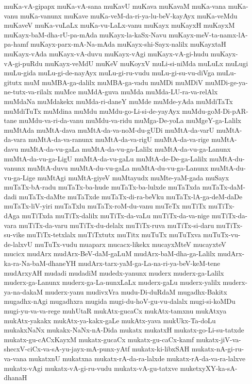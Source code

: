 {muKa-vA-gipapx
muKa-vA-sana
muKavU
muKava
muKavaM
muKa-vana
muKa-vanu
muKa-vanunx
muKave
muKa-veM-da-ri-ya-lu-beV-kayAyx
muKa-veMdu
muKaveV
muKa-vuLaLx
muKa-vu-LaLx-vanu
muKayx
muKayxH
muKayxM
muKayx-baM-dha-rU-pa-mAda
muKayx-la-kaSx-Navu
muKayx-meV-ta-namx-lA-pa-hamf
muKayx-parx-mA-Na-mAda
muKayx-shi-Sayx-nalilx
muKayxtaH
muKayx-vAda
muKayx-vA-duvu
muKayx-vAgi
muKayx-vA-gi-hudu
muKayx-vA-gi-puRdu
muKayx-veMdU
muKeV
muKoyxV
muLi-si-niMda
muLuLx
muLugi
muLu-gida
muLu-gi-de-nayAyx
muLu-gi-ru-vudu
muLu-gi-su-vu-diVga
muLu-gitutx
muM
muMBA-ga-dalilx
muMBA-ga-vadu
muMDi
muMDiV
muMDi-ge-ya-ne-tutx-va-rilalx
muMce
muMdA-guva
muMda
muMda-LU-ra-va-relAlx
muMdaNa
muMdakekx
muMda-ri-daneY
muMde
muMde-yAda
muMdiTaTx
muMdiTuTx
muMdina
muMdu
muMdu-go-Li-si-de-yayAyx
muMdu-goM-Di-pAR-tane
muMdu-va-ri-da-vanu
muMdu-va-ridu
muMga-De-yoLa
muMgeY-ga-Lalilx
muMtAda
muMtA-dava
muMtA-da-va-noM-du-gUDi
muMtA-da-varU
muMtA-da-vara
muMtA-da-va-ranunx
muMtA-da-va-rigU
muMtA-da-va-rige
muMtA-davu
muMtA-da-vu-gaLa
muMtA-da-vu-ga-Lalilx
muMtA-da-vu-ga-Lanunx
muMtA-da-vu-ga-LigU
muMtA-da-vu-gaLu
muMtA-de-De-ga-Lalilx
muMtA-du-vanunx
muMtA-duvu
muMtA-du-vu-gaLa
muMtA-du-vu-ga-Lanunx
muMtA-du-vu-ga-Lige
muMtAgi
muMtA-giyeV
muMtayudx
muMte-yaM-gada
muSayx
muTaTx-bA-radu
muTaTx-ba-hude
muTaTx-ba-lulxde
muTaTxda
muTaTx-daM-dadi
muTaTx-daMte
muTaTxde
muTaTx-di-ra-beVku
muTaTx-lA-ga-deM-daDe
muTaTx-liV-yiri
muTaTxlu
muTaTx-roM-du-vanu
muTeTx
muTiTx
muTiTx-dAga
muTiTxda
muTiTx-dalilx
muTiTx-da-vaLu
muTiTx-da-va-nige
muTiTx-da-vara
muTiTx-da-varu
muTiTx-du-delalx
muTiTx-ruva
muTiTx-si-daru
muTiTx-su-vike
muTiTx-tetxlalx
muTiTxtutx
muTitx
muTuTx
muTuTxva
muTuTx-vu-de-lalxvU
muTuTx-vudu
muaparx
mucacx-likekx
mucayxMteV
mucayxteV
mucicx
mudArx
mudArx-BeV-daM-gaLuM
mudArx-baM-dha-ga-Lalilx
mudArx-ka-ra-Na-baM-dhaneYH
mudArx-tarx-yaM-ga-La-na-ri-ya-beV-keM-tene
mudArxyAH
mudadi
mudadiM
mudedx-yanunx
muderx
muderx-ga-Lalilx
muderx-ga-Lanunx
muderx-ga-La-nunxLaLx
muderx-gaLu
muderx-yalilx
muderx-ya-na-dakaM
muderx-yanu
mudivxVra
mudu-Di-duRdaM
mugadhx-Bakitx
mugadhx-nAgi
mugadhxra
mugida
mugi-du-hoV-gu-vu-dalalx
mugi-si-koMDu
mugi-yu-va-va-rege
muhUtaR
mukAtx-gucaCx
mukAtx-tamxnu
mukAtxya
mukAtx-yakakx
mukAtx-ya-kakx-gaLe
mukAtx-yava
mukUkx-Ta-doLu
mukakxNaNx
mukakx-NaNx-nA-Dida
mukatx
mukatxH
mukatx-go-Li-su-tatxde
mukatx-gu-cACxKayxM
mukatx-gucaCx
mukatx-gu-caCx-kamf
mukatx-jiV-va-shecxV-ciCx-va-sA-yu-jayx-mA-punx-yAtf
mukatx-ki-libxSAH
mukatx-nA-gi-ru-va-vana
mukatxnU
mukatxna
mukatx-rA-da-ra-lalxde
mukatx-rA-da-va-ra-lalxve
mukatx-vAgi
mukatx-vA-gi-ru-vudu
mukatx-vA-gu-tatxve
muketxyXY-ka-sA-dhanaH
}
